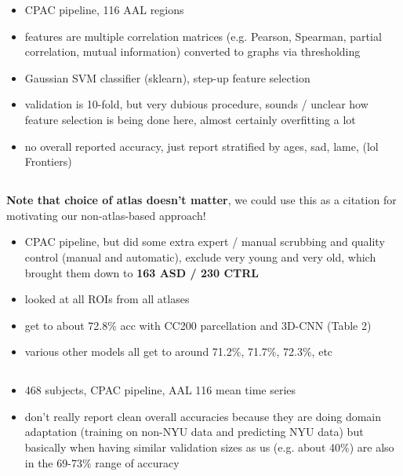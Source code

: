\documentclass[10pt]{article}
\begin{document}
\begin{itemize}
  \item CPAC pipeline, 116 AAL regions
  \item features are multiple correlation matrices (e.g. Pearson, Spearman, partial correlation,
  mutual information) converted to graphs via thresholding
  \item Gaussian SVM classifier (sklearn), step-up feature selection
  \item validation is 10-fold, but very dubious procedure, sounds / unclear how feature selection is
  being done here, almost certainly overfitting a lot
  \item no overall reported accuracy, just report stratified by ages, sad, lame, (lol Frontiers)
\end{itemize}


\subsection{\citet{khoslaEnsembleLearning3D2019}}

\textbf{Note that choice of atlas doesn't matter}, we could use this as a citation for motivating
our non-atlas-based approach!

\begin{itemize}
  \item CPAC pipeline, but did some extra expert / manual scrubbing and quality control (manual and
  automatic), exclude very young and very old, which brought them down to  \textbf{163 ASD / 230
  CTRL}
  \item looked at all ROIs from all atlases
  \item get to about 72.8\% acc with CC200 parcellation and 3D-CNN (Table 2)
  \item various other models all get to around 71.2\%, 71.7\%, 72.3\%, etc
\end{itemize}

\subsection{\citet{wangIdentifyingAutismSpectrum2020}}

\begin{itemize}
  \item 468 subjects, CPAC pipeline, AAL 116 mean time series
  \item don't really report clean overall accuracies because they are doing domain adaptation
  (training on non-NYU data and predicting NYU data) but basically when having similar validation
  sizes as us (e.g. about 40\%) are also in the 69-73\% range of accuracy
\end{itemize}
\end{document}

